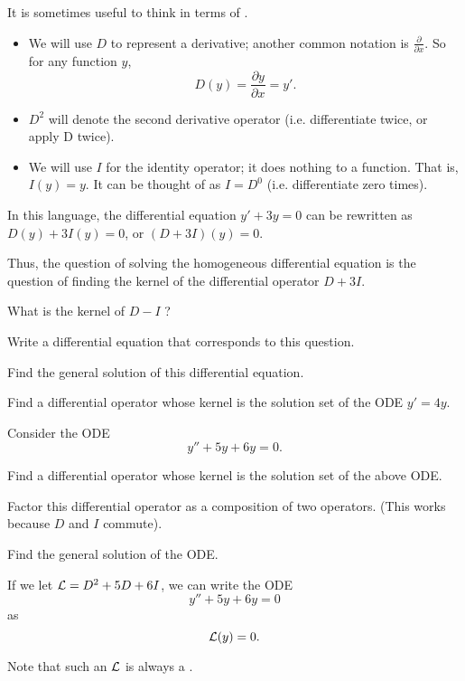 
\begin{applicationActivities}

\begin{observation}
It is sometimes useful to think in terms of .
\begin{itemize}
\item We will use \(D\) to represent a derivative; another common notation is \(\frac{\partial}{\partial x}\).  So for any function \(y\),  \[D(y)=\frac{\partial y}{\partial x}=y'.\]
\item \(D^2\) will denote the second derivative operator (i.e. differentiate twice, or apply D twice).
\item We will use \(I\) for the identity operator; it does nothing to a function.  That is, \(I(y)=y\).  It can be thought of as \(I=D^0\) (i.e. differentiate zero times).
\end{itemize}

In this language, the differential equation \(y'+3y=0\) can be rewritten as \(D(y)+3I(y)=0\), or \( (D+3I)(y)=0\).

Thus, the question of solving the homogeneous differential equation is the question of finding the kernel of the differential operator \(D+3I\).
\end{observation}

\begin{activity}{5}
What is the kernel of \(D-I\) ?
\begin{subactivity}
Write a differential equation that corresponds to this question.
\end{subactivity}
\begin{subactivity}
Find the general solution of this differential equation.
\end{subactivity}
\end{activity}

\begin{activity}{5}
Find a differential operator whose kernel is the solution set of the ODE \(y'=4y\).
\end{activity}

\begin{activity}{10}
Consider the ODE \[y''+5y+6y=0.\]
\begin{subactivity}
Find a differential operator whose kernel is the solution set of the above ODE.
\end{subactivity}
\begin{subactivity}
Factor this differential operator as a composition of two operators. (This works because \(D\) and \(I\) commute).
\end{subactivity}
\begin{subactivity}
Find the general solution of the ODE.
\end{subactivity}
\end{activity}

\begin{observation}
If we let \(\mathcal{L}=D^2+5D+6I\), we can write the ODE \[y''+5y+6y=0\] as \[\mathcal{L}(y)=0.\]

Note that such an \(\mathcal{L}\) is always a .
\end{observation}



\end{applicationActivities}

